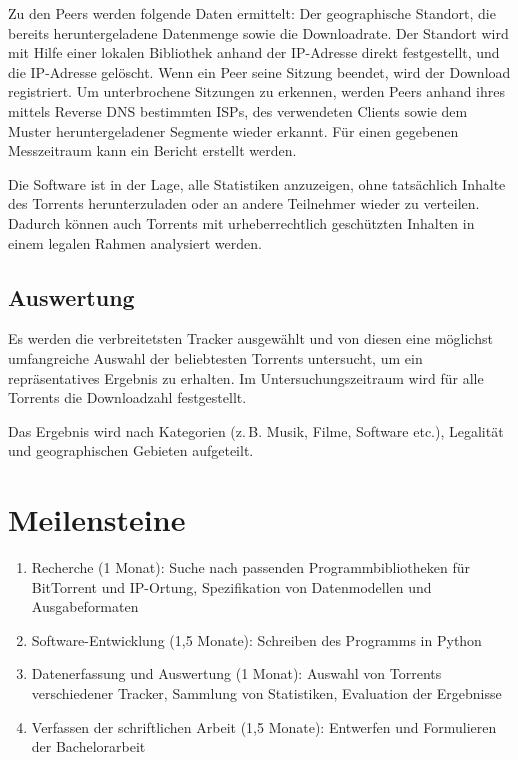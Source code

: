 \documentclass[a4paper]{scrartcl} %
\begin{document}
Zu den Peers werden folgende Daten ermittelt: Der geographische Standort, die bereits heruntergeladene Datenmenge sowie die Downloadrate. Der Standort wird mit Hilfe einer lokalen Bibliothek anhand der IP-Adresse direkt festgestellt, und die IP-Adresse gelöscht. Wenn ein Peer seine Sitzung beendet, wird der Download registriert. Um unterbrochene Sitzungen zu erkennen, werden Peers anhand ihres mittels Reverse DNS bestimmten ISPs, des verwendeten Clients sowie dem Muster heruntergeladener Segmente wieder erkannt. Für einen gegebenen Messzeitraum kann ein Bericht erstellt werden.

Die Software ist in der Lage, alle Statistiken anzuzeigen, ohne tatsächlich Inhalte des Torrents herunterzuladen oder an andere Teilnehmer wieder zu verteilen. Dadurch können auch Torrents mit urheberrechtlich geschützten Inhalten in einem legalen Rahmen analysiert werden.

\subsection{Auswertung}
Es werden die verbreitetsten Tracker ausgewählt und von diesen eine möglichst umfangreiche Auswahl der beliebtesten Torrents untersucht, um ein repräsentatives Ergebnis zu erhalten. Im Untersuchungszeitraum wird für alle Torrents die Downloadzahl festgestellt.

Das Ergebnis wird nach Kategorien (z.\,B. Musik, Filme, Software etc.), Legalität und geographischen Gebieten aufgeteilt.

\section{Meilensteine}
\begin{enumerate}
\item Recherche (1 Monat): Suche nach passenden Programmbibliotheken für BitTorrent und IP-Ortung, Spezifikation von Datenmodellen und Ausgabeformaten
\item Software-Entwicklung (1,5 Monate): Schreiben des Programms in Python
\item Datenerfassung und Auswertung (1 Monat): Auswahl von Torrents verschiedener Tracker, Sammlung von Statistiken, Evaluation der Ergebnisse
\item Verfassen der schriftlichen Arbeit (1,5 Monate): Entwerfen und Formulieren der Bachelorarbeit
\end{enumerate}\pagebreak

\printbibliography
\end{document}
